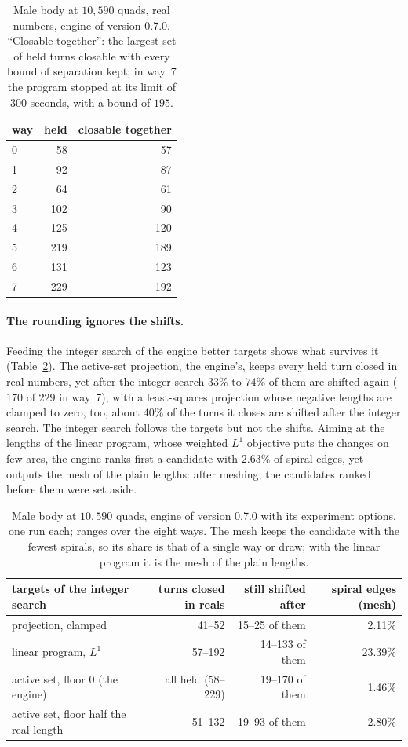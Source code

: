 \documentclass[11pt,a4paper]{article}
\begin{document}
\begin{table}[t]
\centering
\begin{tabular}{lrr}
\toprule
way & held & closable together \\
\midrule
0 & 58 & 57 \\
1 & 92 & 87 \\
2 & 64 & 61 \\
3 & 102 & 90 \\
4 & 125 & 120 \\
5 & 219 & 189 \\
6 & 131 & 123 \\
7 & 229 & 192 \\
\bottomrule
\end{tabular}
\caption{Male body at $10{,}590$ quads, real numbers, engine of version
0.7.0. ``Closable together'': the largest set of held turns closable with
every bound of separation kept; in way~7 the program stopped at its limit
of $300$ seconds, with a bound of $195$.}
\label{tab:exact}
\end{table}

\paragraph{The rounding ignores the shifts.}
Feeding the integer search of the engine better targets shows what survives
it (Table~\ref{tab:rounding}). The active-set projection, the engine's,
keeps every held turn closed in real numbers, yet after the integer search
$33\%$ to $74\%$ of them are shifted again ($170$ of $229$ in way~7); with a
least-squares projection whose negative lengths are clamped to zero, too,
about $40\%$ of the turns it closes are shifted after the integer search.
The integer search follows the targets but not the shifts. Aiming at the
lengths of the linear program, whose weighted $L^1$ objective puts the
changes on few arcs, the engine ranks first a candidate with $2.63\%$ of
spiral edges, yet outputs the mesh of the plain lengths: after meshing, the
candidates ranked before them were set aside.

\begin{table}[t]
\centering
\small
\begin{tabular}{lrrr}
\toprule
targets of the integer search & turns closed in reals & still shifted after & spiral edges (mesh) \\
\midrule
projection, clamped & 41--52 & 15--25 of them & 2.11\% \\
linear program, $L^1$ & 57--192 & 14--133 of them & 23.39\% \\
active set, floor 0 (the engine) & all held (58--229) & 19--170 of them & 1.46\% \\
active set, floor half the real length & 51--132 & 19--93 of them & 2.80\% \\
\bottomrule
\end{tabular}
\caption{Male body at $10{,}590$ quads, engine of version 0.7.0 with its
experiment options, one run each; ranges over the eight ways. The mesh keeps
the candidate with the fewest spirals, so its share is that of a single way
or draw; with the linear program it is the mesh of the plain lengths.}
\label{tab:rounding}
\end{table}
\end{document}
